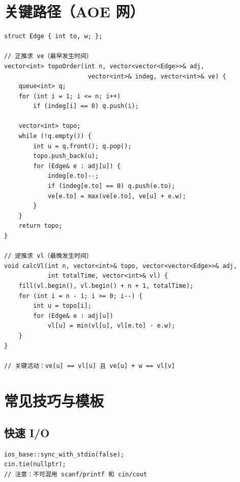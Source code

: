 \documentclass[12pt,a4paper]{article}
\begin{document}
\newpage

\section{关键路径（AOE 网）}

\begin{lstlisting}[caption={拓扑排序求关键路径}]
struct Edge { int to, w; };

// 正推求 ve（最早发生时间）
vector<int> topoOrder(int n, vector<vector<Edge>>& adj,
                       vector<int>& indeg, vector<int>& ve) {
    queue<int> q;
    for (int i = 1; i <= n; i++)
        if (indeg[i] == 0) q.push(i);

    vector<int> topo;
    while (!q.empty()) {
        int u = q.front(); q.pop();
        topo.push_back(u);
        for (Edge& e : adj[u]) {
            indeg[e.to]--;
            if (indeg[e.to] == 0) q.push(e.to);
            ve[e.to] = max(ve[e.to], ve[u] + e.w);
        }
    }
    return topo;
}

// 逆推求 vl（最晚发生时间）
void calcVl(int n, vector<int>& topo, vector<vector<Edge>>& adj,
            int totalTime, vector<int>& vl) {
    fill(vl.begin(), vl.begin() + n + 1, totalTime);
    for (int i = n - 1; i >= 0; i--) {
        int u = topo[i];
        for (Edge& e : adj[u])
            vl[u] = min(vl[u], vl[e.to] - e.w);
    }
}

// 关键活动：ve[u] == vl[u] 且 ve[u] + w == vl[v]
\end{lstlisting}

\newpage

\section{常见技巧与模板}

\subsection{快速 I/O}

\begin{lstlisting}[caption={C++ 加速 I/O}]
ios_base::sync_with_stdio(false);
cin.tie(nullptr);
// 注意：不可混用 scanf/printf 和 cin/cout
\end{lstlisting}
\end{document}
